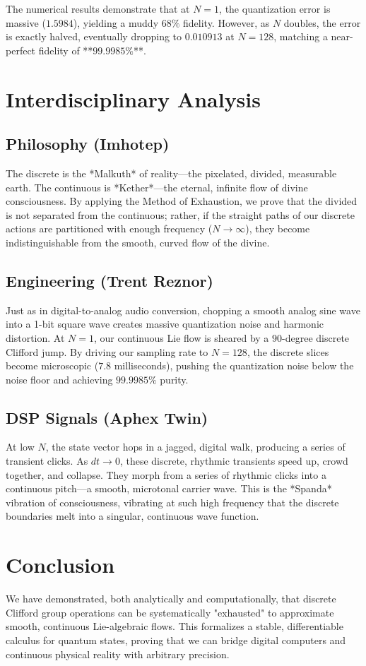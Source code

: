 \documentclass[11pt,twocolumn]{article}
\begin{document}
The numerical results demonstrate that at $N=1$, the quantization error is massive ($1.5984$), yielding a muddy $68\%$ fidelity. However, as $N$ doubles, the error is exactly halved, eventually dropping to $0.010913$ at $N=128$, matching a near-perfect fidelity of **$99.9985\%$**.

\section{Interdisciplinary Analysis}
\subsection{Philosophy (Imhotep)}
The discrete is the *Malkuth* of reality—the pixelated, divided, measurable earth. The continuous is *Kether*—the eternal, infinite flow of divine consciousness. By applying the Method of Exhaustion, we prove that the divided is not separated from the continuous; rather, if the straight paths of our discrete actions are partitioned with enough frequency ($N \to \infty$), they become indistinguishable from the smooth, curved flow of the divine.

\subsection{Engineering (Trent Reznor)}
Just as in digital-to-analog audio conversion, chopping a smooth analog sine wave into a 1-bit square wave creates massive quantization noise and harmonic distortion. At $N=1$, our continuous Lie flow is sheared by a $90$-degree discrete Clifford jump. By driving our sampling rate to $N=128$, the discrete slices become microscopic ($7.8$ milliseconds), pushing the quantization noise below the noise floor and achieving $99.9985\%$ purity.

\subsection{DSP Signals (Aphex Twin)}
At low $N$, the state vector hops in a jagged, digital walk, producing a series of transient clicks. As $dt \to 0$, these discrete, rhythmic transients speed up, crowd together, and collapse. They morph from a series of rhythmic clicks into a continuous pitch—a smooth, microtonal carrier wave. This is the *Spanda* vibration of consciousness, vibrating at such high frequency that the discrete boundaries melt into a singular, continuous wave function.

\section{Conclusion}
We have demonstrated, both analytically and computationally, that discrete Clifford group operations can be systematically "exhausted" to approximate smooth, continuous Lie-algebraic flows. This formalizes a stable, differentiable calculus for quantum states, proving that we can bridge digital computers and continuous physical reality with arbitrary precision.
\end{document}

